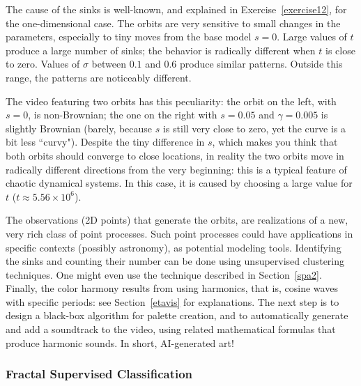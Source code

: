\documentclass[10pt]{article}
\begin{document}
The cause of the sinks is well-known, and explained in Exercise~\ref{exercise12}, for the one-dimensional case. The orbits are very sensitive to small changes in the parameters, especially to
tiny moves from the base model $s=0$. Large values of $t$ produce a large number of sinks; the behavior is radically different when $t$ is close to zero. Values of $\sigma$ between $0.1$ and $0.6$ produce similar patterns. Outside this range, the patterns are noticeably different.

The video featuring two orbits has this peculiarity: the orbit on the left, with $s=0$, is non-Brownian; the one on the right with $s=0.05$ and $\gamma=0.005$ is slightly Brownian (barely, because $s$ is still very close to zero, yet the curve is a bit less ``curvy"). Despite the tiny difference in $s$, which makes you think that both orbits should converge to close locations, in reality the two orbits move in radically different directions from the very beginning: this is a typical feature of chaotic \textcolor{index}{dynamical systems}. In this case, it is caused by choosing a large value for $t$ ($t\approx 5.56\times 10^6$).

The observations (2D points) that generate the orbits, are realizations of a new, very rich class of point processes.
Such point processes could have applications in specific contexts (possibly astronomy), as potential modeling tools. Identifying the sinks and counting their number
can be done using \textcolor{index}{unsupervised clustering} techniques. One might even use the technique
described in Section~\ref{spa2}. Finally, the color harmony results from using harmonics, that is, cosine waves with specific periods: see
Section~\ref{etavis} for explanations. The next step is to design a black-box algorithm for palette creation, and to automatically generate and add a soundtrack to the video, using related mathematical formulas that produce harmonic sounds. In short, AI-generated art!

\subsubsection{Fractal Supervised Classification}\label{videocluster2}
\end{document}
